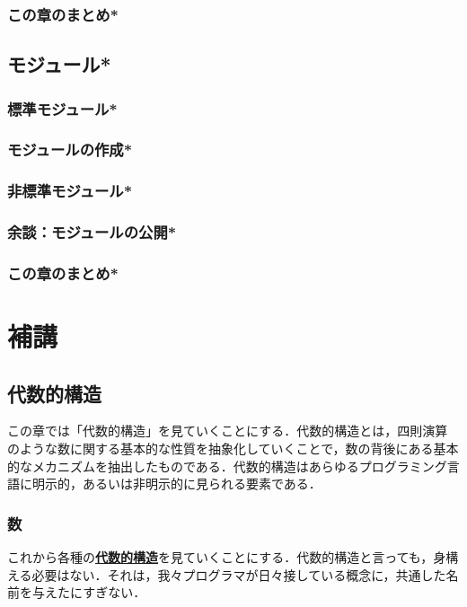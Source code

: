 \documentclass[a4paper,twocolumn]{jsbook}
\newenvironment{leader}{\begingroup\gt}{\endgroup}
\newcommand{\keyword}[1]{{\underline{\textbf{#1}}}}
\begin{document}
\section{この章のまとめ*}

\chapter{モジュール*}
\section{標準モジュール*}
\section{モジュールの作成*}
\section{非標準モジュール*}
\section{余談：モジュールの公開*}
\section{この章のまとめ*}

\part{補講}


\chapter{代数的構造}

\begin{leader}
この章では「代数的構造」を見ていくことにする．代数的構造とは，四則演算のような数に関する基本的な性質を抽象化していくことで，数の背後にある基本的なメカニズムを抽出したものである．代数的構造はあらゆるプログラミング言語に明示的，あるいは非明示的に見られる要素である．
\end{leader}

\section{数}

これから各種の\keyword{代数的構造}を見ていくことにする．代数的構造と言っても，身構える必要はない．それは，我々プログラマが日々接している概念に，共通した名前を与えたにすぎない．
\end{document}
